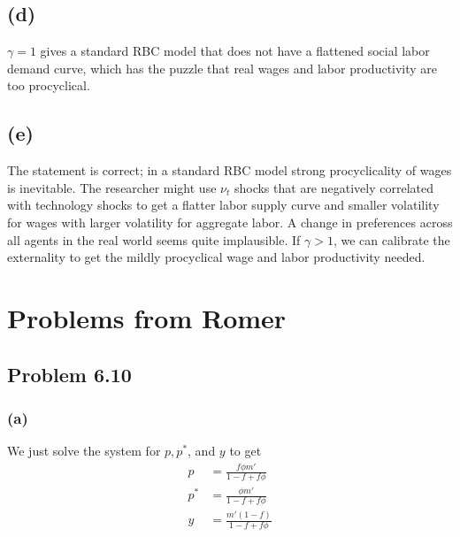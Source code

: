 \documentclass[12pt]{article}
\begin{document}
    \subsection*{(d)}
     $\gamma = 1$ gives a standard RBC model that does not have a flattened social labor demand curve, which has the puzzle that real wages and labor productivity are too procyclical. 
     
     \subsection*{(e)}
     The statement is correct; in a standard RBC model strong procyclicality of wages is inevitable. 
     The researcher might use $\nu_t$ shocks that are negatively correlated with technology shocks to get a flatter labor supply curve and smaller volatility for wages with larger volatility for aggregate labor. 
    A change in preferences across all agents in the real world seems quite implausible.	If $\gamma > 1$, we can calibrate the externality to get the mildly procyclical wage and labor productivity needed. 
    
    
    \section{Problems from Romer}
    \subsection{Problem 6.10}
    
    \subsubsection*{(a)} We just solve the system for $p, p^{*}$, and $y$ to get 
        \begin{align*}
        p & = \frac{f \phi m'}{1 - f + f\phi} \\
        p^{*} & = \frac{\phi m'}{1 - f + f\phi} \\
        y & = \frac{m' (1-f)}{1 - f + f\phi}
        \end{align*}
        
\end{document}
